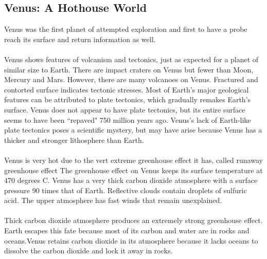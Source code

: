 \documentclass[12pt]{article}
\begin{document}
\subsection{Venus: A Hothouse World} 
Venus was the first planet of attempted exploration and first to have a probe reach its surface and return information as well. \\~\\
Venus shows features of volcanism and tectonics, just as expected for a planet of similar size to Earth. There are impact craters on Venus but fewer than Moon, Mercury and Mars. However, there are many volcanoes on Venus. Fractured and contorted surface indicates tectonic stresses. Most of Earth's major geological features can be attributed to plate tectonics, which gradually remakes Earth's surface. Venus does not appear to have plate tectonics, but its entire surface seems to have been ``repaved" 750 million years ago. Venus's lack of Earth-like plate tectonics poses a scientific mystery, but may have arise because Venus has a thicker and stronger lithosphere than Earth. \\~\\
Venus is very hot due to the vert extreme greenhouse effect it has, called runaway greenhouse effect 
The greenhouse effect on Venus keeps its surface temperature at 470 degrees C. Venus has a very thick carbon dioxide atmosphere with a surface pressure 90 times that of Earth. Reflective clouds contain droplets of sulfuric acid. The upper atmosphere has fast winds that remain unexplained. \\~\\
Thick carbon dioxide atmosphere produces an extremely strong greenhouse effect. Earth escapes this fate because most of its carbon and water are in rocks and oceans.Venus retains carbon dioxide in its atmosphere because it lacks oceans to dissolve the carbon dioxide and lock it away in rocks. 
\end{document}
